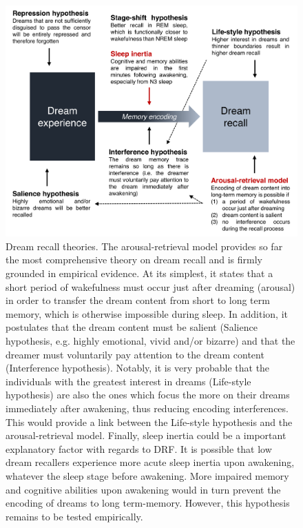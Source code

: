 \begin{figure}[htb]
	\includegraphics[width=\textwidth]{Fig/Intro/Intro_DRF_model/Intro_DRF_model.png}
	\caption[Dream recall theories]{Dream recall theories. The arousal-retrieval model provides so far the most comprehensive theory on dream recall and is firmly grounded in empirical evidence. At its simplest, it states that a short period of wakefulness must occur just after dreaming (arousal) in order to transfer the dream content from short to long term memory, which is otherwise impossible during sleep. In addition, it postulates that the dream content must be salient (Salience hypothesis, e.g. highly emotional, vivid and/or bizarre) and that the dreamer must voluntarily pay attention to the dream content (Interference hypothesis). Notably, it is very probable that the individuals with the greatest interest in dreams (Life-style hypothesis) are also the ones which focus the more on their dreams immediately after awakening, thus reducing encoding interferences. This would provide a link between the Life-style hypothesis and the arousal-retrieval model. Finally, sleep inertia could be a important explanatory factor with regards to DRF. It is possible that low dream recallers experience more acute sleep inertia upon awakening, whatever the sleep stage before awakening. More impaired memory and cognitive abilities upon awakening would in turn prevent the encoding of dreams to long term-memory. However, this hypothesis remains to be tested empirically.}
	\label{fig:intro:dream-recall-models}
\end{figure}
